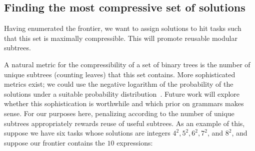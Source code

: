 \documentclass{article}
\begin{document}
\subsection{Finding the most compressive set of solutions}

Having enumerated the frontier, we want to assign solutions
to hit tasks such that this set is maximally compressible. This will
promote reusable modular subtrees. 

A natural metric for the compressibility of a set of binary trees is
the number of unique subtrees (counting leaves) that this set
contains. More sophisticated metrics exist; we could use the negative
logarithm of the probability of the solutions under a suitable
probability distribution~\cite{DBLP:journals/tit/BarronRY98}. Future
work will explore whether this sophistication is worthwhile and which
prior on grammars makes sense. For our purposes here, penalizing
according to the number of unique subtrees appropriately rewards reuse
of useful subtrees. As an example of this, suppose we have six tasks
whose solutions are integers $4^2, 5^2, 6^2, 7^2$, and $8^2$, and
suppose our frontier contains the $10$ expressions:
\vspace{-.3cm}
\captionsetup[subfigure]{labelformat=empty} 
\end{document}
